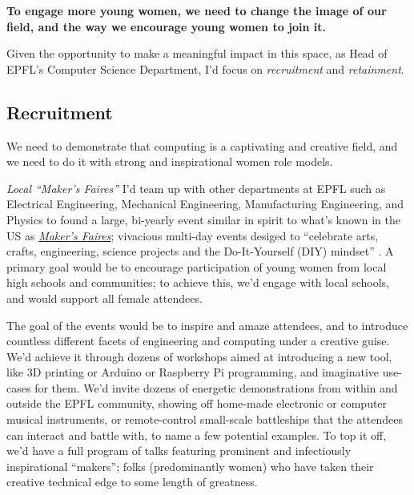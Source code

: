 \documentclass[acmtocl]{acmtrans2m}
\begin{document}

\textbf{To engage more young women, we need to change the image of our field,
and the way we encourage young women to join it.}

Given the opportunity to make a meaningful impact in this space, as Head
of EPFL's Computer Science Department, I'd focus on \textit{recruitment} and
\textit{retainment}.

\vspace{-0.15in}
\subsection*{\textbf{Recruitment}}
\vspace{-0.1in}
We need to demonstrate that computing is a captivating and creative field, and
we need to do it with strong and inspirational women role models.

\textit{\textsf{Local ``Maker's Faires''}}\newline
I'd team up with other departments at EPFL such as Electrical Engineering,
Mechanical Engineering, Manufacturing Engineering, and Physics to found a
large, {bi-yearly} event similar in spirit to what's known in the US as
\href{http://news.cnet.com/8301-13772_3-9935358-52.html}{\textit{Maker's
Faires}}; vivacious multi-day events desiged to ``celebrate arts, crafts,
engineering, science projects and the Do-It-Yourself (DIY) mindset''
\cite{MakerFaire}. A primary goal would be to encourage participation of
young women from local high schools and communities; to achieve this, we'd
engage with local schools, and would support all female attendees.

The goal of the events would be to inspire and amaze attendees, and to
introduce countless different facets of engineering and computing under a
creative guise. We'd achieve it through dozens of workshops aimed at
introducing a new tool, like 3D printing or Arduino or Raspberry Pi
programming, and imaginative use-cases for them. We'd invite dozens of
energetic demonstrations from within and outside the EPFL community, showing
off home-made electronic or computer musical instruments, or remote-control
small-scale battleships that the attendees can interact and battle with, to
name a few potential examples. To top it off, we'd have a full program of
talks featuring prominent and infectiously inspirational ``makers''; folks
(predominantly women) who have taken their creative technical edge to some
length of greatness.
\end{document}
